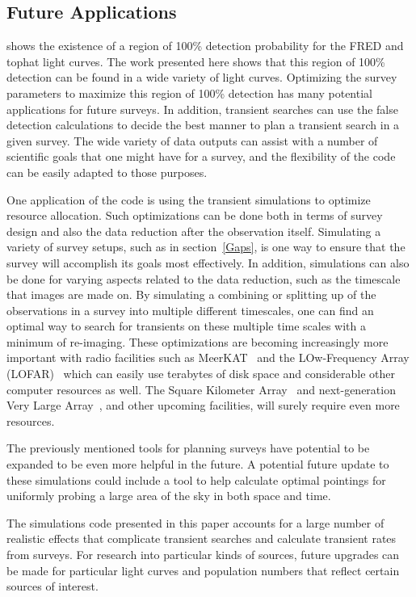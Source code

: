 \documentclass[12pt]{article}
\begin{document}
\subsection{Future Applications} \label{futureapplications}
\citet{2017MNRAS.465.4106C} shows the existence of a region of 100\% detection probability for the FRED and tophat light curves. The work presented here shows that this region of 100\% detection can be found in a wide variety of light curves. Optimizing the survey parameters to maximize this region of 100\% detection has many potential applications for future surveys. In addition, transient searches can use the false detection calculations to decide the best manner to plan a transient search in a given survey. The wide variety of data outputs can assist with a number of scientific goals that one might have for a survey, and the flexibility of the code can be easily adapted to those purposes.

One application of the code is using the transient simulations to optimize resource allocation. Such optimizations can be done both in terms of survey design and also the data reduction after the observation itself. Simulating a variety of survey setups, such as in section~\ref{Gaps}, is one way to ensure that the survey will accomplish its goals most effectively. In addition, simulations can also be done for varying aspects related to the data reduction, such as the timescale that images are made on. By simulating a combining or splitting up of the observations in a survey into multiple different timescales, one can find an optimal way to search for transients on these multiple time scales with a minimum of re-imaging. These optimizations are becoming increasingly more important with radio facilities such as MeerKAT~\citep{2016mks..confE...1J} and the LOw-Frequency Array (LOFAR)~\citep{2013A&A...556A...2V} which can easily use terabytes of disk space and considerable other computer resources as well. The Square Kilometer Array~\citep{2009IEEEP..97.1482D} and next-generation Very Large Array~\citep{2018ASPC..517....3M}, and other upcoming facilities, will surely require even more resources.

The previously mentioned tools for planning surveys have potential to be expanded to be even more helpful in the future. A potential future update to these simulations could include a tool to help calculate optimal pointings for uniformly probing a large area of the sky in both space and time. 

The simulations code presented in this paper accounts for a large number of realistic effects that complicate transient searches and calculate transient rates from surveys. For research into particular kinds of sources, future upgrades can be made for particular light curves and population numbers that reflect certain sources of interest. 
\end{document}
